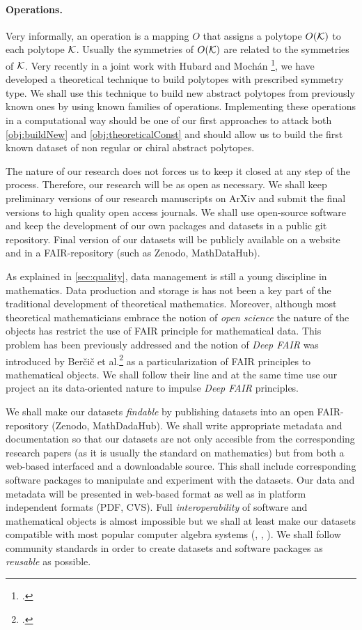 \paragraph{Operations. } Very informally, an operation is a mapping $O$ that assigns a polytope $O(\mathcal{K})$ to each polytope $\mathcal{K}$. Usually the symmetries of $O(\mathcal{K})$ are related to the symmetries of $\mathcal{K}$. Very recently in a joint work with Hubard and Mochán
\footcite{HubardMochanMontero__VoltageOperationsManiplexes_preprint}, we have developed a theoretical technique%
to build polytopes with prescribed symmetry type.
We shall use this technique to build new abstract polytopes from previously known ones by using known families of operations.
Implementing these operations in a computational way should be one of our first approaches to attack both \cref{obj:buildNew} and \cref{obj:theoreticalConst} and should allow us to build the first known dataset of non regular or chiral abstract polytopes.

The nature of our research does not forces us to keep it closed at any step of the process.
Therefore, our research will be as open as necessary.
We shall keep preliminary versions of our research manuscripts on ArXiv and submit the final versions to high quality open access journals.
We shall use open-source software and keep the development of our own packages and datasets in a public git repository.
Final version of our datasets will be publicly available on a website and in a FAIR-repository (such as Zenodo, MathDataHub).

As explained in \cref{sec:quality}, data management is still a young discipline in mathematics. Data production and storage is has not been a key part of the traditional development of theoretical mathematics.
Moreover, although most theoretical mathematicians embrace the notion of \emph{open science} the nature of the objects has restrict the use of FAIR principle for mathematical data.
This problem has been previously addressed and the notion of \emph{Deep FAIR} was introduced by Berčič et al.\footcite{BercicKohlhaseRabe_2020_DeepFairMathematics} as a particularization of FAIR principles to mathematical objects.
We shall follow their line and at the same time use our project an its data-oriented nature to impulse \emph{Deep FAIR} principles.

We shall make our datasets \emph{findable} by publishing datasets into an open FAIR-repository (Zenodo, MathDadaHub). We shall write appropriate metadata and documentation so that our datasets are not only accesible from the corresponding research papers (as it is usually the standard on mathematics) but from both a web-based interfaced and a downloadable source.
This shall include corresponding software packages to manipulate and experiment with the datasets. Our data and metadata will be presented in web-based format as well as in platform independent formats (PDF, CVS).
Full \emph{interoperability} of software and mathematical objects is almost impossible but we shall at least make our datasets compatible with most popular computer algebra systems (\gap, \sage, \magma). We shall follow community standards in order to create datasets and software packages as \emph{reusable} as possible.

